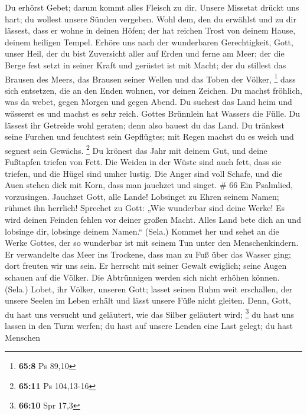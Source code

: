  Du erhörst Gebet; darum kommt alles Fleisch zu dir.
 Unsere Missetat drückt uns hart; du wollest unsere Sünden
vergeben.  Wohl dem, den du erwählst und zu dir lässest,
dass er wohne in deinen Höfen; der hat reichen Trost von deinem Hause,
deinem heiligen Tempel.  Erhöre uns nach der wunderbaren
Gerechtigkeit, Gott, unser Heil, der du bist Zuversicht aller auf Erden
und ferne am Meer;  der die Berge fest setzt in seiner Kraft
und gerüstet ist mit Macht;  der du stillest das Brausen des
Meers, das Brausen seiner Wellen und das Toben der Völker, \footnote{\textbf{65:8}
  Ps 89,10}  dass sich entsetzen, die an den Enden wohnen,
vor deinen Zeichen. Du machst fröhlich, was da webet, gegen Morgen und
gegen Abend.  Du suchest das Land heim und wässerst es und
machst es sehr reich. Gottes Brünnlein hat Wassers die Fülle. Du lässest
ihr Getreide wohl geraten; denn also bauest du das Land. 
Du tränkest seine Furchen und feuchtest sein Gepflügtes; mit Regen
machst du es weich und segnest sein Gewächs. \footnote{\textbf{65:11} Ps
  104,13-16}  Du krönest das Jahr mit deinem Gut, und deine
Fußtapfen triefen von Fett.  Die Weiden in der Wüste sind
auch fett, dass sie triefen, und die Hügel sind umher lustig.
 Die Anger sind voll Schafe, und die Auen stehen dick mit
Korn, dass man jauchzet und singet. \# 66  Ein Psalmlied,
vorzusingen. Jauchzet Gott, alle Lande!  Lobsinget zu Ehren
seinem Namen; rühmet ihn herrlich!  Sprechet zu Gott: „Wie
wunderbar sind deine Werke! Es wird deinen Feinden fehlen vor deiner
großen Macht.  Alles Land bete dich an und lobsinge dir,
lobsinge deinem Namen.`` (Sela.)  Kommet her und sehet an
die Werke Gottes, der so wunderbar ist mit seinem Tun unter den
Menschenkindern.  Er verwandelte das Meer ins Trockene, dass
man zu Fuß über das Wasser ging; dort freuten wir uns sein. 
Er herrscht mit seiner Gewalt ewiglich; seine Augen schauen auf die
Völker. Die Abtrünnigen werden sich nicht erhöhen können. (Sela.)
 Lobet, ihr Völker, unseren Gott; lasset seinen Ruhm weit
erschallen,  der unsere Seelen im Leben erhält und lässt
unsere Füße nicht gleiten.  Denn, Gott, du hast uns
versucht und geläutert, wie das Silber geläutert wird; \footnote{\textbf{66:10}
  Spr 17,3}  du hast uns lassen in den Turm werfen; du hast
auf unsere Lenden eine Last gelegt;  du hast Menschen
